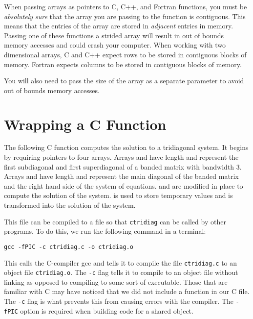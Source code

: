 \begin{warn}
When passing arrays as pointers to C, C++, and Fortran functions, you must be \emph{absolutely sure} that the array you are passing to the function is contiguous.
This means that the entries of the array are stored in \emph{adjacent} entries in memory.
Passing one of these functions a strided array will result in out of bounds memory accesses and could crash your computer.
When working with two dimensional arrays, C and C++ expect rows to be stored in contiguous blocks of memory.
Fortran expects columns to be stored in contiguous blocks of memory.

You will also need to pass the size of the array as a separate parameter to avoid out of bounds memory accesses.
\end{warn}

\section*{Wrapping a C Function}
The following C function computes the solution to a tridiagonal system.
It begins by requiring pointers to four arrays.
Arrays  and  have length  and represent the first subdiagonal and first superdiagonal of a banded matrix with bandwidth 3.
Arrays  and  have length  and represent the main diagonal of the banded matrix and the right hand side of the system of equations.
 and  are modified in place to compute the solution of the system.
 is used to store temporary values and  is transformed into the solution of the system.



This file can be compiled to a  file so that \texttt{ctridiag} can be called by other programs. To do this, we run the following command in a terminal:
\begin{lstlisting}[style=ShellInput]
gcc -fPIC -c ctridiag.c -o ctridiag.o
\end{lstlisting}
This calls the C-compiler gcc and tells it to compile the file \texttt{ctridiag.c} to an object file \texttt{ctridiag.o}.
The \texttt{-c} flag tells it to compile to an object file without linking as opposed to compiling to some sort of executable.
Those that are familiar with C may have noticed that we did not include a  function in our C file.
The \texttt{-c} flag is what prevents this from causing errors with the compiler.
The \texttt{-fPIC} option is required when building code for a shared object.

